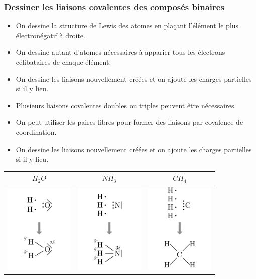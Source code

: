 \documentclass[
  11pt,
  french,
  a4paper,
  openany]{book}
\providecommand{\tightlist}{%
  \setlength{\itemsep}{0pt}\setlength{\parskip}{0pt}}
\begin{document}
\hypertarget{dessiner-les-liaisons-covalentes-des-composuxe9s-binaires}{%
\subsubsection{Dessiner les liaisons covalentes des composés binaires}\label{dessiner-les-liaisons-covalentes-des-composuxe9s-binaires}}

\begin{itemize}
\tightlist
\item
  On dessine la structure de Lewis des atomes en plaçant l'élément le plus électronégatif à droite.
\item
  On dessine autant d'atomes nécessaires à apparier tous les électrons célibataires de chaque élément.
\item
  On dessine les liaisons nouvellement créées et on ajoute les charges partielles si il y lieu.
\item
  Plusieurs liaisons covalentes doubles ou triples peuvent être nécessaires.
\item
  On peut utiliser les paires libres pour former des liaisons par covalence de coordination.
\item
  On dessine les liaisons nouvellement créées et on ajoute les charges partielles si il y lieu.
\end{itemize}

\begin{longtable}[]{@{}ccc@{}}
\toprule
\(H_2O\) & \(NH_3\) & \(CH_4\)\tabularnewline
\midrule
\endhead
\includegraphics[width=9em,height=\textheight]{images/dessin-covalentes-H2O.png} & \includegraphics[width=9em,height=\textheight]{images/dessin-covalentes-NH3.png} & \includegraphics[width=9em,height=\textheight]{images/dessin-covalentes-CH4.png}\tabularnewline
\bottomrule
\end{longtable}
\end{document}
